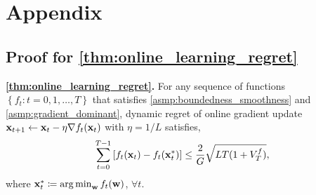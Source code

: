\section{Appendix}

\subsection{Proof for \cref{thm:online_learning_regret}}

\textbf{\cref{thm:online_learning_regret}.} For any sequence of functions $\left\{ f_t : t = 0, 1, \dots, T \right\}$ that satisfies \cref{asmp:boundedness_smoothness} and \cref{asmp:gradient_dominant}, dynamic regret of online gradient update ${\mathbf{x}}_{t+1} \gets {\mathbf{x}}_{t} - \eta \nabla f_{t}({\mathbf{x}}_{t})$ with $\eta = 1/L$ satisfies,
\begin{equation}
\label{eq:online_learning_regret_appendix}
\begin{split}
    \sum\limits_{t=0}^{T-1}{\left[ f_t({\mathbf{x}}_t) - f_t( {\mathbf{x}}_t^*) \right]} \le \frac{2}{G} \sqrt{L T ( 1 + V_T^f )},
\end{split}
\end{equation}
where ${\mathbf{x}}_t^* \coloneqq \operatorname*{arg\,min}_{{\mathbf{w}}}{f_t({\mathbf{w}})}$, $\forall t$.

